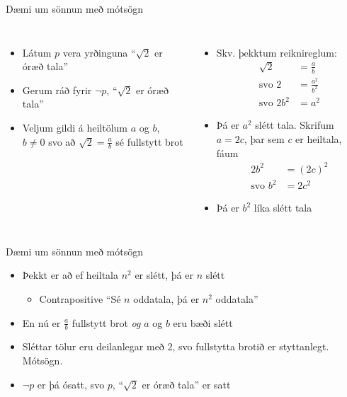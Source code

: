 \documentclass[handout]{beamer}
\begin{document}
\begin{frame}{Dæmi um sönnun með mótsögn}
    \begin{columns}
        \begin{itemize}[<+->]
            \item Látum $p$ vera yrðinguna ``$\sqrt{2}$ er óræð tala''
            \item Gerum ráð fyrir $\lnot p$, ``$\sqrt{2}$ er óræð tala''
            \item Veljum gildi á heiltölum $a$ og $b$, $b \neq 0$ svo að $\sqrt{2} = \frac{a}{b}$ sé fullstytt brot
        \end{itemize}
        \begin{itemize}[<+->]
            \item Skv. þekktum reiknireglum:
            \begin{align*}
                \sqrt{2} &= \frac{a}{b}\\
                \text{svo } 2 &= \frac{a^2}{b^2}\\
                \text{svo } 2b^2 &= a^2
            \end{align*}
            \item Þá er $a^2$ slétt tala. Skrifum $a = 2c$, þar sem $c$ er heiltala, fáum 
            \begin{align*}
                2b^2 &= (2c)^2\\
                \text{svo } b^2 &= 2c^2
            \end{align*}
            \item Þá er $b^2$ líka slétt tala
        \end{itemize}
    \end{columns}
\end{frame}

\begin{frame}{Dæmi um sönnun með mótsögn}
    \begin{itemize}
        \item Þekkt er að ef heiltala $n^2$ er slétt, þá er $n$ slétt \pause
        \begin{itemize}
            \item Contrapositive ``Sé $n$ oddatala, þá er $n^2$ oddatala''
        \end{itemize}
        \item En nú er $\frac{a}{b}$ fullstytt brot \emph{og} $a$ og $b$ eru bæði slétt
        \item Sléttar tölur eru deilanlegar með 2, svo fullstytta brotið er styttanlegt. Mótsögn.
        \item $\lnot p$ er þá ósatt, svo $p$, ``$\sqrt{2}$ er óræð tala'' er satt
    \end{itemize}
\end{frame}
\end{document}
